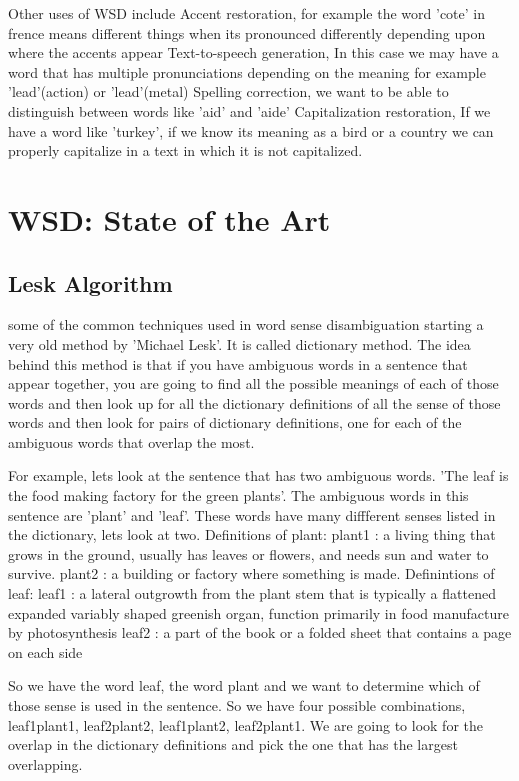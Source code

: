\documentclass[article,dr=phil,type=drfinal,colorback,accentcolor=tud9c]{tudthesis}
\begin{document}
Other uses of WSD include
Accent restoration, for example the word 'cote' in frence means different things when its pronounced differently depending upon where the accents appear
Text-to-speech generation, In this case we may have a word that has multiple pronunciations depending on the meaning for example 'lead'(action) or 'lead'(metal)
Spelling correction, we want to be able to distinguish between words like 'aid' and 'aide'
Capitalization restoration, If we have a word like 'turkey', if we know its meaning as a bird or a country we can properly capitalize in a text in which it is not capitalized.

\newpage
\section{WSD: State of the Art}

\subsection{Lesk Algorithm}
some of the common techniques used in word sense disambiguation starting a very old method by 'Michael Lesk'. It is called dictionary method. The idea behind this method is that if you have ambiguous words in a sentence that appear together, you are going to find all the possible meanings of each of those words and then look up for all the dictionary definitions of all the sense of those words and then look for pairs of dictionary definitions, one for each of the ambiguous words that overlap the most.

For example, lets look at the sentence that has two ambiguous words. 'The leaf is the food making factory for the green plants'. The ambiguous words in this sentence are 'plant' and 'leaf'. These words have many diffferent senses listed in the dictionary, lets look at two.
Definitions of plant:
plant1 : a living thing that grows in the ground, usually has leaves or flowers, and needs sun and water to survive.
plant2 : a building or factory where something is made.
Definintions of leaf:
leaf1 : a lateral outgrowth from the plant stem that is typically a flattened expanded variably shaped greenish organ, function primarily in food manufacture by photosynthesis
leaf2 : a part of the book or a folded sheet that contains a page on each side

So we have the word leaf, the word plant and we want to determine which of those sense is used in the sentence. So we have four possible combinations, leaf1plant1, leaf2plant2, leaf1plant2, leaf2plant1. We are going to look for the overlap in the dictionary definitions and pick the one that has the largest overlapping.
\newpage
\end{document}
